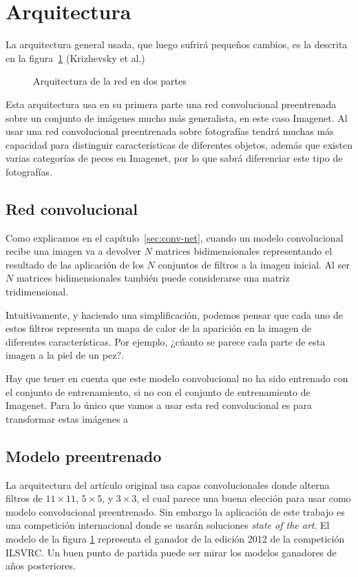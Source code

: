 \section{Arquitectura}

La arquitectura general usada, que luego sufrirá pequeños cambios, es la descrita en la figura~\ref{general-architecture} (Krizhevsky et al.)

\begin{figure}
  \caption{Arquitectura de la red en dos partes}
\label{general-architecture}
\end{figure}

Esta arquitectura usa en su primera parte una red convolucional preentrenada sobre un conjunto de imágenes mucho más generalista, en este caso Imagenet. Al usar una red convolucional preentrenada sobre fotografías tendrá muchas más capacidad para distinguir características de diferentes objetos, además que existen varias categorías de peces en Imagenet, por lo que sabrá diferenciar este tipo de fotografías.


\subsection{Red convolucional}

Como explicamos en el capítulo~\ref{sec:conv-net}, cuando un modelo convolucional recibe una imagen va a devolver $N$ matrices bidimensionales representando el resultado de las aplicación de los $N$ conjuntos de filtros a la imagen inicial. Al ser $N$ matrices bidimensionales también puede considerarse una matriz tridimensional.

Intuitivamente, y haciendo una simplificación, podemos pensar que cada uno de estos filtros representa un mapa de calor de la aparición en la imagen de diferentes características. Por ejemplo, ¿cúanto se parece cada parte de esta imagen a la piel de un pez?.

Hay que tener en cuenta que este modelo convolucional no ha sido entrenado con el conjunto de entrenamiento, si no con el conjunto de entrenamiento de Imagenet. Para lo único que vamos a usar esta red convolucional es para transformar estas imágenes a 

\subsection{Modelo preentrenado}

La arquitectura del artículo original \parencite{krizhevsky2012imagenet} usa capas convolucionales donde alterna filtros de $11\times11$, $5\times5$, y $3\times3$, el cual parece una buena elección para usar como modelo convolucional preentrenado. Sin embargo la aplicación de este trabajo es una competición internacional donde se usarán soluciones \textit{state of the art}. El modelo de la figura \ref{general-architecture} representa el ganador de la edición 2012 de la competición ILSVRC. Un buen punto de partida puede ser mirar los modelos ganadores de años posteriores.

